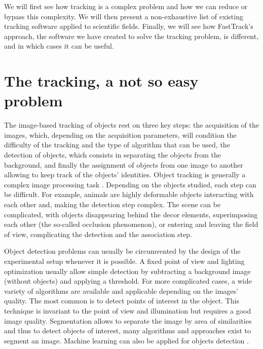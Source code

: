     We will first see how tracking is a complex problem and how we can reduce or bypass this complexity. We will then present a non-exhaustive list of existing tracking software applied to scientific fields. Finally, we will see how FastTrack's approach, the software we have created to solve the tracking problem, is different, and in which cases it can be useful.

	\section{The tracking, a not so easy problem}
    The image-based tracking of objects rest on three key steps: the acquisition of the images, which, depending on the acquisition parameters, will condition the difficulty of the tracking and the type of algorithm that can be used, the detection of objects, which consists in separating the objects from the background, and finally the assignment of objects from one image to another allowing to keep track of the objects' identities. Object tracking is generally a complex image processing task \cite{dell2014automated}. Depending on the objects studied, each step can be difficult. For example, animals are highly deformable objects interacting with each other and, making the detection step complex. The scene can be complicated, with objects disappearing behind the decor elements, superimposing each other (the so-called occlusion phenomenon), or entering and leaving the field of view, complicating the detection and the association step.

    Object detection problems can usually be circumvented by the design of the experimental setup whenever it is possible. A fixed point of view and lighting optimization usually allow simple detection by subtracting a background image (without objects) and applying a threshold. For more complicated cases, a wide variety of algorithms are available \cite{yilmaz2006object} and applicable depending on the images' quality. The most common is to detect points of interest in the object. This technique is invariant to the point of view and illumination but requires a good image quality. Segmentation allows to separate the image by area of similarities and thus to detect objects of interest, many algorithms and approaches exist to segment an image. Machine learning can also be applied for objects detection \cite{zhao2019object}.

